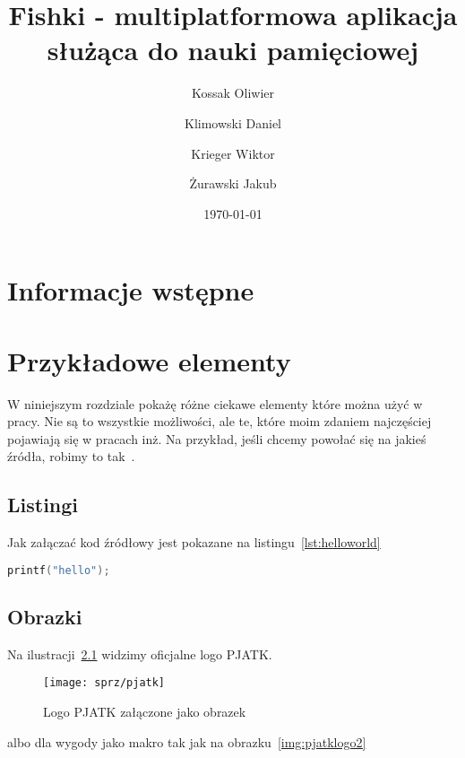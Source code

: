 \documentclass{sprz}
\title{Fishki - multiplatformowa aplikacja służąca do nauki pamięciowej}
\author{Kossak Oliwier}{s22018}{Sztuczna Inteligencja}{Niestacjonarny}
\author{Klimowski Daniel}{s18504}{Sztuczna Inteligencja}{Niestacjonarny}
\author{Krieger Wiktor}{s23638}{Sztuczna Inteligencja}{Niestacjonarny}
\author{Żurawski Jakub}{s23047}{Sztuczna Inteligencja}{Niestacjonarny}
\date{\today}
\begin{document}
    \maketitle

    \makeprojectcard
    \makedeclaration

    \tableofcontents

    \chapter{Informacje wstępne}

    

    

    \chapter{Przykładowe elementy}

    W niniejszym rozdziale pokażę różne ciekawe elementy które można użyć w pracy. Nie są to wszystkie możliwości, ale te, które moim zdaniem najczęściej pojawiają się w pracach inż. Na przykład, jeśli chcemy powołać się na jakieś źródła, robimy to tak~\cite{BEHESHTIROUI2021107419}.

    \section{Listingi}

    Jak załączać kod źródłowy jest pokazane na listingu~\ref{lst:helloworld}


    \begin{lstlisting}[language=c,caption={Przykładowy witaj w świecie}, label={lst:helloworld}]
printf("hello");
    \end{lstlisting}

    \section{Obrazki}

    Na ilustracji~\ref{img:pjatklogo} widzimy oficjalne logo PJATK.

    \begin{figure}[h]
        \centering
        \texttt{[image: sprz/pjatk]}
        \caption{Logo PJATK załączone jako obrazek}
        \label{img:pjatklogo}
    \end{figure}

    albo dla wygody jako makro tak jak na obrazku~\ref{img:pjatklogo2}
\end{document}
